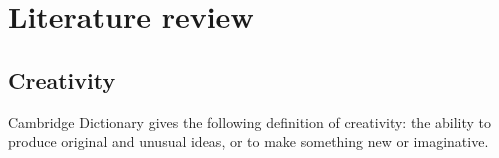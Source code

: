 
\chapter{Literature review} %

\label{Chapter2} %


\section{Creativity}




Cambridge Dictionary gives the following definition of creativity:
the ability to produce original and unusual ideas, or to make something new or imaginative.



